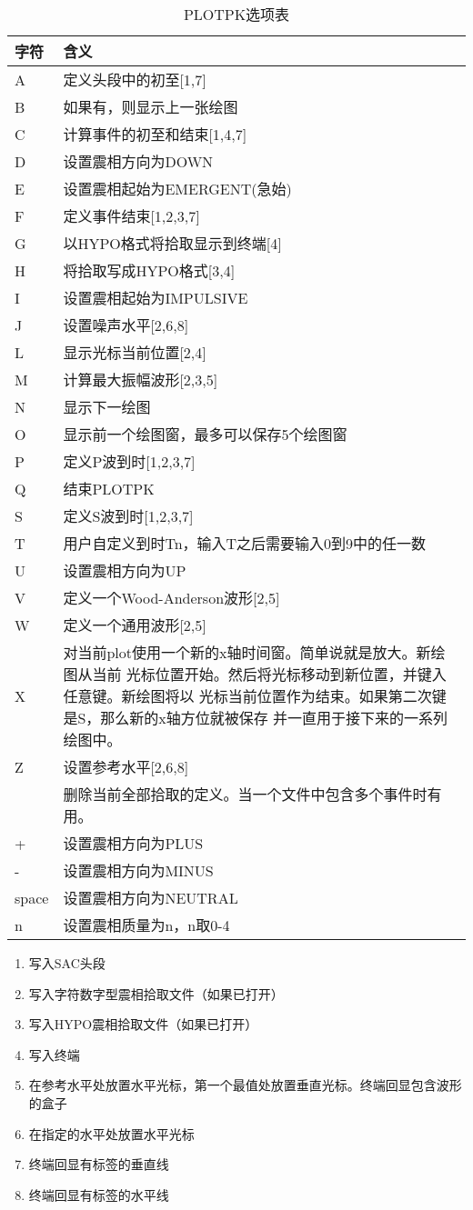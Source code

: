 \begin{table}
\centering
\caption{PLOTPK选项表}
\begin{tabular}{p{1cm}p{14cm}}
	\toprule
	字符	&	含义	\\
	\midrule
	A	&	定义头段中的初至[1,7]	\\
	B	&	如果有，则显示上一张绘图	\\
	C	&	计算事件的初至和结束[1,4,7]	\\
	D	&	设置震相方向为DOWN	\\
	E	&	设置震相起始为EMERGENT(急始)	\\
	F	&	定义事件结束[1,2,3,7]	\\
	G	&	以HYPO格式将拾取显示到终端[4]	\\
	H	&	将拾取写成HYPO格式[3,4]	\\
	I	&	设置震相起始为IMPULSIVE	\\
	J	&	设置噪声水平[2,6,8]	\\
	L	&	显示光标当前位置[2,4]	\\
	M	&	计算最大振幅波形[2,3,5]	\\
	N	&	显示下一绘图	\\
	O	&	显示前一个绘图窗，最多可以保存5个绘图窗	\\
	P	&	定义P波到时[1,2,3,7]	\\
	Q	&	结束PLOTPK	\\
	S	&	定义S波到时[1,2,3,7]	\\
	T	&	用户自定义到时Tn，输入T之后需要输入0到9中的任一数	\\
	U	&	设置震相方向为UP	\\
	V	&	定义一个Wood-Anderson波形[2,5]	\\
	W	&	定义一个通用波形[2,5]	\\
	X	&	对当前plot使用一个新的x轴时间窗。简单说就是放大。新绘图从当前
			光标位置开始。然后将光标移动到新位置，并键入任意键。新绘图将以
			光标当前位置作为结束。如果第二次键是S，那么新的x轴方位就被保存
			并一直用于接下来的一系列绘图中。	\\
	Z	&	设置参考水平[2,6,8]	\\
	\	&	删除当前全部拾取的定义。当一个文件中包含多个事件时有用。	\\
	+	&	设置震相方向为PLUS	\\
	-	&	设置震相方向为MINUS	\\
	space &	设置震相方向为NEUTRAL	\\
	n	&	设置震相质量为n，n取0-4	\\
	\bottomrule
\end{tabular}
\end{table}

\begin{enumerate}
\item 写入SAC头段
\item 写入字符数字型震相拾取文件（如果已打开）
\item 写入HYPO震相拾取文件（如果已打开）
\item 写入终端
\item 在参考水平处放置水平光标，第一个最值处放置垂直光标。终端回显包含波形的盒子
\item 在指定的水平处放置水平光标
\item 终端回显有标签的垂直线
\item 终端回显有标签的水平线
\end{enumerate}
